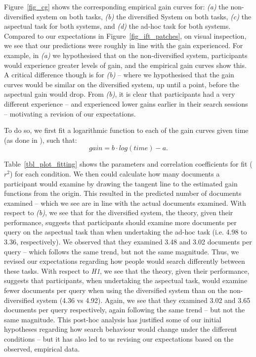 Figure~\ref{fig_cg} shows the corresponding empirical gain curves for: \textit{(a)} the non-diversified system on both tasks, \textit{(b)} the diversified System on both tasks, \textit{(c)} the aspectual task for both systems, and \textit{(d)} the ad-hoc task for both systems. Compared to our expectations in Figure~\ref{fig_ift_patches}, on visual inspection, we see that our predictions were roughly in line with the gain experienced. For example, in \textit{(a)} we hypothesised that on the non-diversified system, participants would experience greater levels of gain, and the empirical gain curves show this. A critical difference though is for \textit{(b)} -- where we hypothesised that the gain curves would be similar on the diversified system, up until a point, before the aspectual gain would drop. From \textit{(b)}, it is clear that participants had a very different experience -- and experienced lower gains earlier in their search sessions -- motivating a revision of our expectations.

To do so, we first fit a logarithmic function to each of the gain curves given time (as done in \cite{ath2014ift}), such that:
\begin{equation}
gain = b \cdot log(time) - a.
\end{equation}

Table~\ref{tbl_plot_fitting} shows the parameters and correlation coefficients for fit ($r^2$) for each condition. We then could calculate how many documents a participant would examine by drawing the tangent line to the estimated gain functions from the origin. This resulted in the predicted number of documents examined -- which we see are in line with the actual documents examined. With respect to \textit{(b)}, we see that for the diversified system, the theory, given their performance, suggests that participants should examine more documents per query on the aspectual task than when undertaking the ad-hoc task (i.e. 4.98 to 3.36, respectively). We observed that they examined 3.48 and 3.02 documents per query -- which follows the same trend, but not the same magnitude. Thus, we revised our expectations regarding how people would search differently between these tasks. With respect to \textit{H1}, we see that the theory, given their performance, suggests that participants, when undertaking the aspectual task, would examine fewer documents per query when using the diversified system than on the non-diversified system (4.36 vs 4.92). Again, we see that they examined 3.02 and 3.65 documents per query respectively, again following the same trend -- but not the same magnitude. This post-hoc analysis has justified some of our initial hypotheses regarding how search behaviour would change under the different conditions -- but it has also led to us revising our expectations based on the observed, empirical data.

